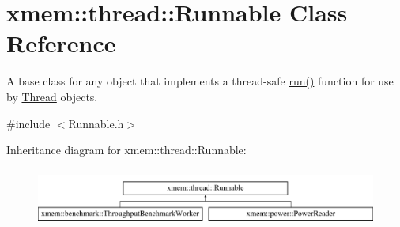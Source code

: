 \hypertarget{classxmem_1_1thread_1_1_runnable}{\section{xmem\-:\-:thread\-:\-:Runnable Class Reference}
\label{classxmem_1_1thread_1_1_runnable}
}


A base class for any object that implements a thread-\/safe \hyperlink{classxmem_1_1thread_1_1_runnable_af2915224b03db20403550291672733a7}{run()} function for use by \hyperlink{classxmem_1_1thread_1_1_thread}{Thread} objects.  




{\ttfamily \#include $<$Runnable.\-h$>$}

Inheritance diagram for xmem\-:\-:thread\-:\-:Runnable\-:\begin{figure}[H]
\begin{center}
\leavevmode
\includegraphics[height=1.911263cm]{classxmem_1_1thread_1_1_runnable}
\end{center}
\end{figure}
